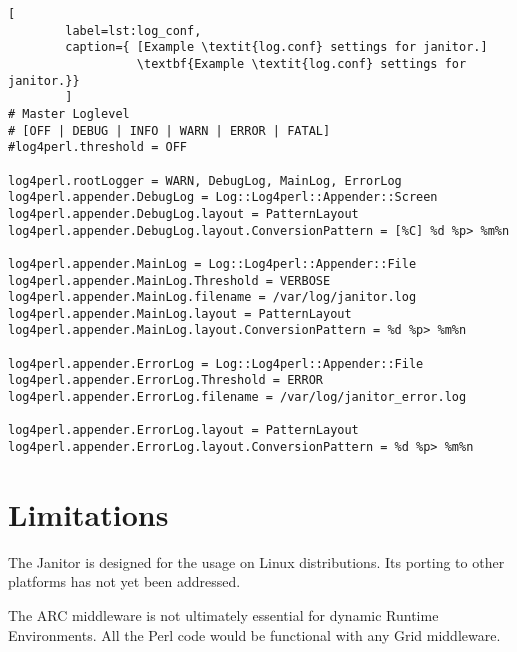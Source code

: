 \begin{lstlisting}[
        label=lst:log_conf,
        caption={ [Example \textit{log.conf} settings for janitor.]
                  \textbf{Example \textit{log.conf} settings for janitor.}}
        ]
# Master Loglevel
# [OFF | DEBUG | INFO | WARN | ERROR | FATAL]
#log4perl.threshold = OFF

log4perl.rootLogger = WARN, DebugLog, MainLog, ErrorLog
log4perl.appender.DebugLog = Log::Log4perl::Appender::Screen
log4perl.appender.DebugLog.layout = PatternLayout
log4perl.appender.DebugLog.layout.ConversionPattern = [%C] %d %p> %m%n

log4perl.appender.MainLog = Log::Log4perl::Appender::File
log4perl.appender.MainLog.Threshold = VERBOSE
log4perl.appender.MainLog.filename = /var/log/janitor.log
log4perl.appender.MainLog.layout = PatternLayout
log4perl.appender.MainLog.layout.ConversionPattern = %d %p> %m%n

log4perl.appender.ErrorLog = Log::Log4perl::Appender::File
log4perl.appender.ErrorLog.Threshold = ERROR
log4perl.appender.ErrorLog.filename = /var/log/janitor_error.log

log4perl.appender.ErrorLog.layout = PatternLayout
log4perl.appender.ErrorLog.layout.ConversionPattern = %d %p> %m%n
\end{lstlisting}



\section{Limitations}

The Janitor is designed for the usage on Linux distributions.
Its porting to other platforms has not yet been addressed.

The ARC middleware is not ultimately essential for dynamic Runtime Environments.
All the Perl code would be functional with any Grid middleware.

